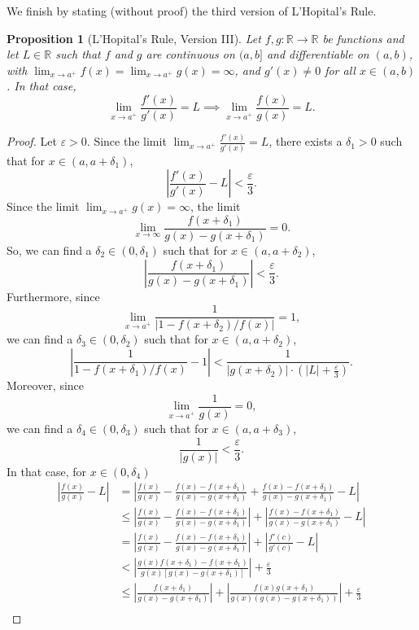 \documentclass[a4paper, openany]{memoir}
\theoremstyle{definition}
\theoremstyle{plain}
\newtheorem{proposition}[definition]{Proposition}
\begin{document}
We finish by stating (without proof) the third version of L'Hopital's Rule.
\begin{proposition}[L'Hopital's Rule, Version III]
Let $f, g: \mathbb{R} \to \mathbb{R}$ be functions and let $L \in \mathbb{R}$ such that $f$ and $g$ are continuous on $(a, b]$ and differentiable on $(a, b)$, with $\lim_{x \to a^+} f(x) = \lim_{x \to a^+} g(x) = \infty$, and $g'(x) \neq 0$ for all $x \in (a, b)$. In that case,
\[\lim_{x \to a^+} \frac{f'(x)}{g'(x)} = L \implies \lim_{x \to a^+} \frac{f(x)}{g(x)} = L.\]
\end{proposition}
\begin{proof}
Let $\varepsilon > 0$. Since the limit $\lim_{x \to a^+} \frac{f'(x)}{g'(x)} = L$, there exists a $\delta_1 > 0$ such that for $x \in (a, a+\delta_1)$,
\[\left|\frac{f'(x)}{g'(x)} - L\right|< \frac{\varepsilon}{3}.\]
Since the limit $\lim_{x \to a^+} g(x) = \infty$, the limit
\[\lim_{x \to \infty} \frac{f(x + \delta_1)}{g(x) - g(x + \delta_1)} = 0.\]
So, we can find a $\delta_2 \in (0, \delta_1)$ such that for $x \in (a, a+\delta_2)$,
\[\left|\frac{f(x + \delta_1)}{g(x) - g(x + \delta_1)}\right| < \frac{\varepsilon}{3}.\]
Furthermore, since
\[\lim_{x \to a^+} \frac{1}{|1 - f(x + \delta_2)/f(x)|} = 1,\]
we can find a $\delta_3 \in (0, \delta_2)$ such that for $x \in (a, a+\delta_2)$,
\[\left|\frac{1}{1 - f(x+\delta_1)/f(x)} - 1\right| < \frac{1}{|g(x + \delta_2)| \cdot (|L| + \frac{\varepsilon}{3})}.\]
Moreover, since
\[\lim_{x \to a^+} \frac{1}{g(x)} = 0,\]
we can find a $\delta_4 \in (0, \delta_3)$ such that for $x \in (a, a+\delta_3)$,
\[\frac{1}{|g(x)|} < \frac{\varepsilon}{3}.\]
In that case, for $x \in (0, \delta_4)$
\begin{align*}
    \left|\frac{f(x)}{g(x)} - L\right| &= \left|\frac{f(x)}{g(x)} - \frac{f(x) - f(x + \delta_1)}{g(x) - g(x + \delta_1)} + \frac{f(x) - f(x + \delta_1)}{g(x) - g(x + \delta_1)} - L\right| \\
    &\leqslant \left|\frac{f(x)}{g(x)} - \frac{f(x) - f(x + \delta_1)}{g(x) - g(x + \delta_1)}\right| + \left|\frac{f(x) - f(x + \delta_1)}{g(x) - g(x + \delta_1)} - L\right| \\
    &= \left|\frac{f(x)}{g(x)} - \frac{f(x) - f(x + \delta_1)}{g(x) - g(x + \delta_1)}\right| + \left|\frac{f'(c)}{g'(c)} - L\right| \\
    &< \left|\frac{g(x) f(x + \delta_1) - f(x + \delta_1)}{g(x)[g(x) - g(x + \delta_1)]}\right| + \frac{\varepsilon}{3} \\
    &\leqslant \left|\frac{f(x + \delta_1)}{g(x) - g(x + \delta_1)}\right| + \left|\frac{f(x) g(x + \delta_1)}{g(x) (g(x) - g(x+\delta_1))}\right| + \frac{\varepsilon}{3} \\

\end{align*}
\end{proof}
\end{document}
